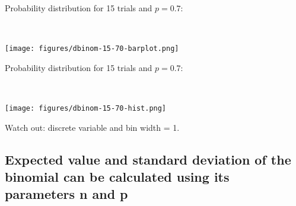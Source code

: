 \documentclass[slidestop,compress,mathserif,12pt,t,professionalfonts,xcolor=table]{beamer}
\begin{document}

\begin{frame}

Probability distribution for 15 trials and $p=0.7$:

\hfill \\

\begin{center}
\texttt{[image: figures/dbinom-15-70-barplot.png]}
\end{center}

\end{frame}


\begin{frame}

Probability distribution for 15 trials and $p=0.7$:

\hfill \\

\begin{center}
\texttt{[image: figures/dbinom-15-70-hist.png]}

Watch out: discrete variable and bin width = 1.
\end{center}

\end{frame}


\subsection{Expected value and standard deviation of the binomial can be calculated using its parameters n and p}
\label{mi2}

\end{document}
